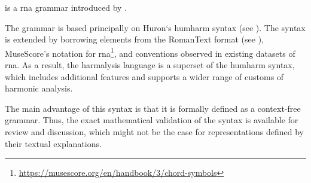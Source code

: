 

 is a \gls{rna} grammar introduced by
\textcite{napoleslopez2020harmalysis}.

The  grammar is based principally on
Huron‘s \gls{humharm} syntax (see
). The syntax is extended by
borrowing elements from the RomanText format (see
), MuseScore's notation for
\gls{rna}\footnote{\href{https://musescore.org/en/handbook/3/chord-symbols\#rna}{https://musescore.org/en/handbook/3/chord-symbols}},
and conventions observed in existing datasets of \gls{rna}.
As  a result,  the harmalysis language is a superset  of
the \gls{humharm} syntax,  which includes additional
features and supports a wider range of customs of harmonic
analysis.

The main advantage of this syntax is that it is formally
defined as a context-free grammar. Thus, the exact
mathematical validation of the syntax is available for
review and discussion, which might not be the case for
representations defined by their textual explanations.
